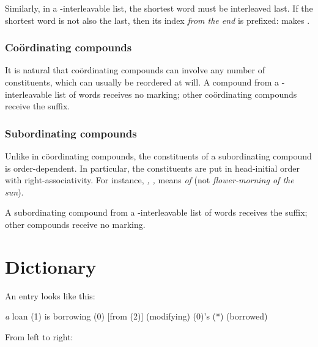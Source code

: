 \documentclass{book}
\begin{document}
Similarly, in a \tidim-interleavable list, the shortest word must be interleaved last. If the shortest word is not also the last, then its index \emph{from the end} is prefixed:  makes .

\subsection{Coördinating compounds}

It is natural that coördinating compounds can involve any number of constituents, which can usually be reordered at will. A compound from a \tieq-interleavable list of words receives no marking; other coördinating compounds receive the  suffix.

\subsection{Subordinating compounds}

Unlike in cöordinating compounds, the constituents of a subordinating compound is order-dependent. In particular, the constituents are put in head-initial order with right-associativity. For instance,  \emph{, , } means \emph{ of } (not \emph{flower-morning of the sun}).

A subordinating compound from a \tieq-interleavable list of words receives the  suffix; other compounds receive no marking.

\appendix

\chapter{Dictionary}

An entry looks like this:

 \textit{a}
\quad loan \quad (1) is borrowing (0) [from (2)] \quad (modifying) (0)'s (*) (borrowed)

From left to right:
\end{document}
